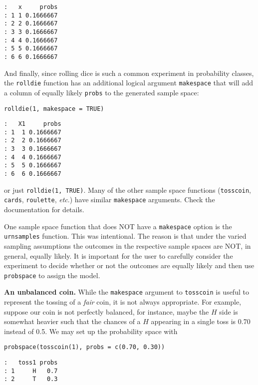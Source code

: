 \begin{verbatim}
:   x     probs
: 1 1 0.1666667
: 2 2 0.1666667
: 3 3 0.1666667
: 4 4 0.1666667
: 5 5 0.1666667
: 6 6 0.1666667
\end{verbatim}

And finally, since rolling dice is such a common experiment in
probability classes, the \texttt{rolldie} function has an additional logical
argument \texttt{makespace} that will add a column of equally likely \texttt{probs}
to the generated sample space:

\begin{verbatim}
rolldie(1, makespace = TRUE)
\end{verbatim}

\begin{verbatim}
:   X1     probs
: 1  1 0.1666667
: 2  2 0.1666667
: 3  3 0.1666667
: 4  4 0.1666667
: 5  5 0.1666667
: 6  6 0.1666667
\end{verbatim}

\noindent
or just \texttt{rolldie(1, TRUE)}. Many of the other sample space functions
(\texttt{tosscoin}, \texttt{cards}, \texttt{roulette}, \emph{etc}.) have similar \texttt{makespace}
arguments. Check the documentation for details.



One sample space function that does NOT have a \texttt{makespace} option is
the \texttt{urnsamples} function. This was intentional. The reason is that
under the varied sampling assumptions the outcomes in the respective
sample spaces are NOT, in general, equally likely. It is important for
the user to carefully consider the experiment to decide whether or not
the outcomes are equally likely and then use \texttt{probspace} to assign the
model.

\label{exa-unbalanced-coin} \textbf{An unbalanced coin.} While the \texttt{makespace}
argument to \texttt{tosscoin} is useful to represent the tossing of a \emph{fair}
coin, it is not always appropriate. For example, suppose our coin is
not perfectly balanced, for instance, maybe the \(H\) side is somewhat
heavier such that the chances of a \(H\) appearing in a single toss is
0.70 instead of 0.5. We may set up the probability space with

\begin{verbatim}
probspace(tosscoin(1), probs = c(0.70, 0.30)) 
\end{verbatim}

\begin{verbatim}
:   toss1 probs
: 1     H   0.7
: 2     T   0.3
\end{verbatim}


